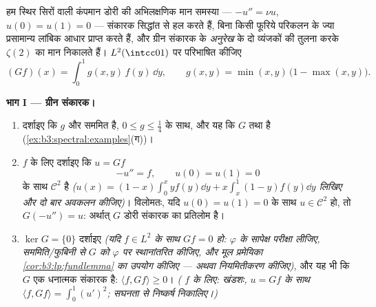 \begin{problem}[{सप्ताहांत समस्या --- ग्रीन संकारक, ज्या आधार,
और एक अनुरेख सूत्र}]\label{pb:b3:spectral:1}
हम स्थिर सिरों वाली कंपमान डोरी की अभिलक्षणिक मान समस्या ---
$-u'' = \nu u$, $u(0) = u(1) = 0$ --- संकारक सिद्धांत से हल करते हैं, बिना किसी फूरिये
परिकलन के ज्या प्रसामान्य लांबिक आधार प्राप्त करते हैं, और ग्रीन
संकारक के \emph{अनुरेख} के दो व्यंजकों की तुलना करके $\zeta(2)$ का मान
निकालते हैं। $L^2(\intcc01)$ पर परिभाषित कीजिए
\[
(Gf)(x) = \int_0^1 g(x,y)\,f(y)\,\dd y,
\qquad
g(x, y) = \min(x,y)\,\bigl(1 - \max(x,y)\bigr).
\]

\medskip
\noindent\textbf{भाग I --- ग्रीन संकारक।}
\begin{enumerate}
  \item दर्शाइए कि $g$  और सममित है, $0 \leq g
        \leq \frac14$ के साथ, और यह कि
        $G$  तथा  है (\cref{ex:b3:spectral:examples}(ग))।
  \item {} $f$ के लिए दर्शाइए कि $u = Gf$ \[
        -u'' = f, \qquad u(0) = u(1) = 0
        \] के साथ $\mathcal
        C^2$ है
        \emph{($u(x) = (1-x)\int_0^xyf(y)\dd y +
        x\int_x^1(1-y)f(y)\dd y$ लिखिए और दो बार अवकलन कीजिए)}। विलोमतः, यदि
        $u(0) = u(1)
        = 0$ के साथ $u \in \mathcal C^2$ हो, तो $G(-u'') = u$: अर्थात् $G$ डोरी संकारक
        का प्रतिलोम है।
  \item $\ker G = \{0\}$ दर्शाइए \emph{(यदि $f \in
        L^2$ के साथ $Gf = 0$ हो: 
        $\varphi$ के सापेक्ष परीक्षा लीजिए, सममिति/फुबिनी से $G$ को
        $\varphi$ पर स्थानांतरित कीजिए, और मूल प्रमेयिका \cref{cor:b3:lp:fundlemma} का
        उपयोग कीजिए --- अथवा नियमितीकरण कीजिए)}, और यह भी कि $G$
        एक धनात्मक संकारक है: $\langle f, Gf\rangle \geq 0$। \emph{( $f$ के लिए:
        खंडशः, $u
        = Gf$ के साथ $\langle f, Gf\rangle = \int_0^1 (u')^2$; सघनता से निष्कर्ष निकालिए।)}
\end{enumerate}


\end{problem}
